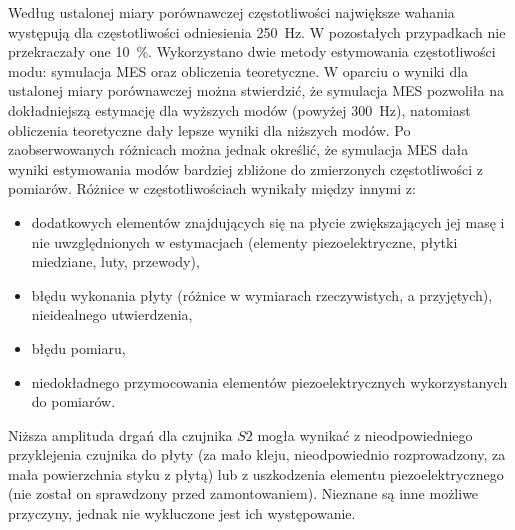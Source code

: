 \documentclass[polish,a4paper,11pt]{mwart}
\begin{document}
Według ustalonej miary porównawczej częstotliwości największe wahania występują
dla częstotliwości odniesienia \SI{250}{\hertz}. W pozostałych przypadkach nie
przekraczały one \SI{10}{\percent}. Wykorzystano dwie metody estymowania
częstotliwości modu: symulacja MES oraz obliczenia teoretyczne. W oparciu o
wyniki dla ustalonej miary porównawczej można stwierdzić, że symulacja MES
pozwoliła na dokładniejszą estymację dla wyższych modów (powyżej
\SI{300}{\hertz}), natomiast obliczenia teoretyczne dały lepsze wyniki dla
niższych modów. Po zaobserwowanych różnicach można jednak określić, że
symulacja MES dała wyniki estymowania modów bardziej zbliżone do zmierzonych
częstotliwości z pomiarów.  Różnice w częstotliwościach wynikały między innymi
z:
\begin{itemize}
  \item dodatkowych elementów znajdujących się na płycie zwiększających jej masę i nie
    uwzględnionych w estymacjach (elementy piezoelektryczne, płytki miedziane,
    luty, przewody), 
  \item błędu wykonania płyty (różnice w wymiarach rzeczywistych, a przyjętych),
    nieidealnego utwierdzenia,
  \item błędu pomiaru,
  \item niedokładnego przymocowania elementów piezoelektrycznych wykorzystanych
    do pomiarów.
\end{itemize}%
Niższa amplituda drgań dla czujnika $S2$ mogła wynikać z nieodpowiedniego
przyklejenia czujnika do płyty (za mało kleju, nieodpowiednio rozprowadzony, za
mała powierzchnia styku z płytą) lub z uszkodzenia elementu piezoelektrycznego
(nie został on sprawdzony przed zamontowaniem). Nieznane są inne możliwe
przyczyny, jednak nie wykluczone jest ich występowanie.

\printbibliography[title=Bibliografia]
\end{document}
